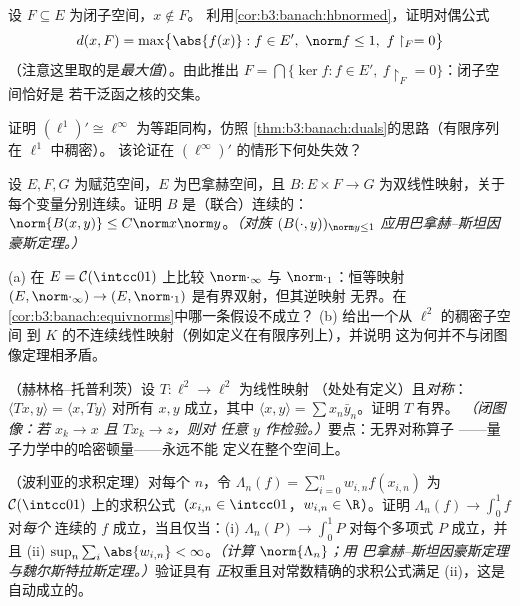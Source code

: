 \begin{exercise}[$\star\star$]\label{exo:b3:banach:4}
设 $F \subseteq E$ 为闭子空间，$x \notin F$。
利用\cref{cor:b3:banach:hbnormed}，证明对偶公式
\[
d(x, F) = \max\bigl\{\abs{f(x)} : f \in E',\ \norm f \leq 1,\
f\restriction_F = 0\bigr\}
\]
（注意这里取的是\emph{最大值}）。由此推出 $F = \bigcap\{\ker f : f
\in E',\ f\restriction_F = 0\}$：闭子空间恰好是
若干泛函之核的交集。
\end{exercise}

\begin{exercise}[$\star\star$]\label{exo:b3:banach:5}
证明 $(\ell^1)' \cong \ell^\infty$ 为等距同构，仿照
\cref{thm:b3:banach:duals}的思路（有限序列
在 $\ell^1$ 中稠密）。
该论证在 $(\ell^\infty)'$ 的情形下何处失效？
\end{exercise}

\begin{exercise}[$\star\star$]\label{exo:b3:banach:6}
设 $E, F, G$ 为赋范空间，$E$ 为巴拿赫空间，且 $B \colon E \times
F \to G$ 为双线性映射，关于每个变量分别连续。证明
$B$ 是（联合）连续的：$\norm{B(x,y)} \leq
C\norm x\norm y$。\emph{（对族
$(B(\cdot, y))_{\norm y \leq 1}$ 应用巴拿赫–斯坦因豪斯定理。）}
\end{exercise}

\begin{exercise}[$\star\star$]\label{exo:b3:banach:7}
(a) 在 $E = \mathcal C(\intcc01)$ 上比较 $\norm\cdot_\infty$
与 $\norm\cdot_1$：恒等映射 $(E, \norm\cdot_\infty) \to
(E, \norm\cdot_1)$ 是有界双射，但其逆映射
无界。在
\cref{cor:b3:banach:equivnorms}中哪一条假设不成立？
(b) 给出一个从 $\ell^2$ 的稠密子空间
到 $K$ 的不连续线性映射（例如定义在有限序列上），并说明
这为何并不与闭图像定理相矛盾。
\end{exercise}

\begin{exercise}[$\star\star\star$]\label{exo:b3:banach:8}
（赫林格–托普利茨）设 $T \colon \ell^2 \to \ell^2$ 为线性映射
（处处有定义）且\emph{对称}：$\langle Tx,
y\rangle = \langle x, Ty\rangle$ 对所有 $x, y$ 成立，其中 $\langle
x, y \rangle = \sum x_n\bar y_n$。证明 $T$ 有界。
\emph{（闭图像：若 $x_k \to x$ 且 $Tx_k \to z$，则对
任意 $y$ 作检验。）}要点：无界对称算子
——量子力学中的哈密顿量——永远不能
定义在整个空间上。
\end{exercise}

\begin{exercise}[$\star\star\star$]\label{exo:b3:banach:9}
（波利亚的求积定理）对每个 $n$，令 $\Lambda_n(f)
= \sum_{i=0}^{n} w_{i,n}f(x_{i,n})$ 为
$\mathcal C(\intcc01)$ 上的求积公式（$x_{i,n} \in \intcc01$，$w_{i,n} \in
\R$）。证明 $\Lambda_n(f) \to \int_0^1f$ 对\emph{每个}
连续的 $f$ 成立，当且仅当：(i) $\Lambda_n(P) \to \int_0^1P$
对每个多项式 $P$ 成立，并且 (ii) $\sup_n\sum_i\abs{w_{i,n}} <
\infty$。\emph{（计算 $\norm{\Lambda_n}$；用
巴拿赫–斯坦因豪斯定理与魏尔斯特拉斯定理。）}验证具有
\emph{正}权重且对常数精确的求积公式满足
(ii)，这是自动成立的。
\end{exercise}


